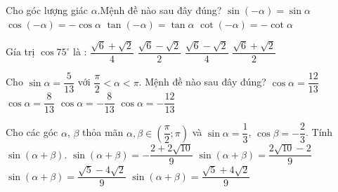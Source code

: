 \begin{ex}
    Cho góc lượng giác $\alpha $.Mệnh đề nào sau đây đúng?
    \choice
    {$\sin \left(-\alpha\right)=\sin \alpha $}
    {$\cos \left(-\alpha\right)=-\cos \alpha $}
    {$\tan \left(-\alpha\right)=\tan \alpha $}
    {\True $\cot \left(-\alpha\right)=-\cot \alpha $}
    \end{ex}
    \begin{ex}
    Gía trị $\cos 75^\circ $ là :
    \choice
    {$\dfrac{\sqrt{6}+\sqrt{2}}{4}$}
    {$\dfrac{\sqrt{6}-\sqrt{2}}{2}$}
    {\True $\dfrac{\sqrt{6}-\sqrt{2}}{4}$}
    {$\dfrac{\sqrt{6}+\sqrt{2}}{2}$}
    \end{ex}
    \begin{ex}
    Cho $\sin \alpha =\dfrac{5}{13}$ với $\dfrac{\pi }{2}<\alpha <\pi $. Mệnh đề nào sau đây đúng?
    \choice
    {$\cos \alpha =\dfrac{12}{13}$}
    {$\cos \alpha =\dfrac{8}{13}$}
    {$\cos \alpha =-\dfrac{8}{13}$}
    {\True $\cos \alpha =-\dfrac{12}{13}$}
    \end{ex}
    \begin{ex}
    Cho các góc $\alpha $, $\beta $ thỏa mãn $\alpha ,\beta \in \left(\dfrac{\pi }{2};\pi\right)$ và $\sin \alpha =\dfrac{1}{3}$, $\cos \beta =-\dfrac{2}{3}$. Tính $\sin \left(\alpha +\beta\right)$.
    \choice
    {\True $\sin \left(\alpha +\beta\right)=-\dfrac{2+2\sqrt{10}}{9}$}
    {$\sin \left(\alpha +\beta\right)=\dfrac{2\sqrt{10}-2}{9}$}
    {$\sin \left(\alpha +\beta\right)=\dfrac{\sqrt{5}-4\sqrt{2}}{9}$}
    {$\sin \left(\alpha +\beta\right)=\dfrac{\sqrt{5}+4\sqrt{2}}{9}$}
    \end{ex}
